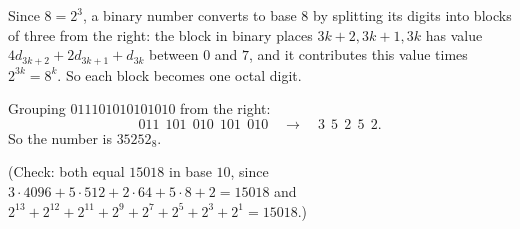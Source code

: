 Since $8=2^3$, a binary number converts to base $8$ by splitting its digits into blocks of three from the right: the block in binary places $3k+2,3k+1,3k$ has value $4d_{3k+2}+2d_{3k+1}+d_{3k}$ between $0$ and $7$, and it contributes this value times $2^{3k}=8^k$. So each block becomes one octal digit.

Grouping $011101010101010$ from the right:
\[011\ \ 101\ \ 010\ \ 101\ \ 010\quad\longrightarrow\quad 3\ \ 5\ \ 2\ \ 5\ \ 2.\]
So the number is $\boxed{35252_8}$.

(Check: both equal $15018$ in base $10$, since $3\cdot4096+5\cdot512+2\cdot64+5\cdot8+2=15018$ and $2^{13}+2^{12}+2^{11}+2^9+2^7+2^5+2^3+2^1=15018$.)
